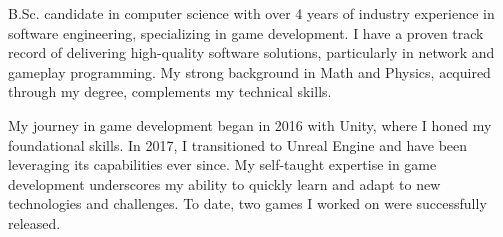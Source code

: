

\begin{cvparagraph}

B.Sc. candidate in computer science with over 4 years of industry experience in software engineering, specializing in game development. I have a proven track record of delivering high-quality software solutions, particularly in network and gameplay programming. My strong background in Math and Physics, acquired through my degree, complements my technical skills.

My journey in game development began in 2016 with Unity, where I honed my foundational skills. In 2017, I transitioned to Unreal Engine and have been leveraging its capabilities ever since. My self-taught expertise in game development underscores my ability to quickly learn and adapt to new technologies and challenges. To date, two games I worked on were successfully released.

\end{cvparagraph}
